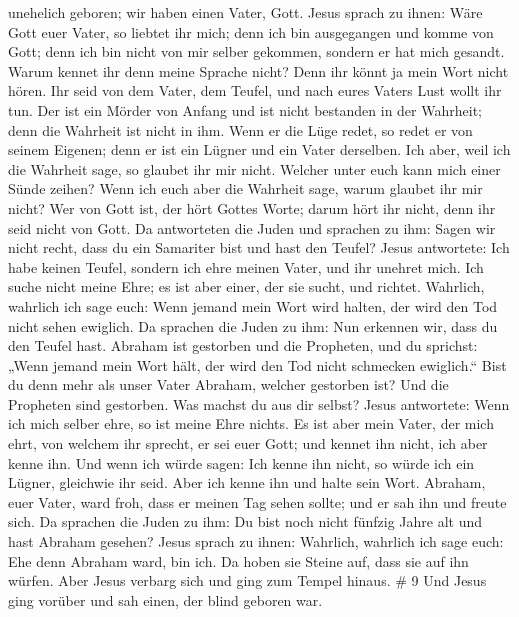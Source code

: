 unehelich geboren; wir haben einen Vater, Gott.  Jesus
sprach zu ihnen: Wäre Gott euer Vater, so liebtet ihr mich; denn ich bin
ausgegangen und komme von Gott; denn ich bin nicht von mir selber
gekommen, sondern er hat mich gesandt.  Warum kennet ihr
denn meine Sprache nicht? Denn ihr könnt ja mein Wort nicht hören.
 Ihr seid von dem Vater, dem Teufel, und nach eures Vaters
Lust wollt ihr tun. Der ist ein Mörder von Anfang und ist nicht
bestanden in der Wahrheit; denn die Wahrheit ist nicht in ihm. Wenn er
die Lüge redet, so redet er von seinem Eigenen; denn er ist ein Lügner
und ein Vater derselben.  Ich aber, weil ich die Wahrheit
sage, so glaubet ihr mir nicht.  Welcher unter euch kann
mich einer Sünde zeihen? Wenn ich euch aber die Wahrheit sage, warum
glaubet ihr mir nicht?  Wer von Gott ist, der hört Gottes
Worte; darum hört ihr nicht, denn ihr seid nicht von Gott. 
Da antworteten die Juden und sprachen zu ihm: Sagen wir nicht recht,
dass du ein Samariter bist und hast den Teufel?  Jesus
antwortete: Ich habe keinen Teufel, sondern ich ehre meinen Vater, und
ihr unehret mich.  Ich suche nicht meine Ehre; es ist aber
einer, der sie sucht, und richtet.  Wahrlich, wahrlich ich
sage euch: Wenn jemand mein Wort wird halten, der wird den Tod nicht
sehen ewiglich.  Da sprachen die Juden zu ihm: Nun erkennen
wir, dass du den Teufel hast. Abraham ist gestorben und die Propheten,
und du sprichst: „Wenn jemand mein Wort hält, der wird den Tod nicht
schmecken ewiglich.``  Bist du denn mehr als unser Vater
Abraham, welcher gestorben ist? Und die Propheten sind gestorben. Was
machst du aus dir selbst?  Jesus antwortete: Wenn ich mich
selber ehre, so ist meine Ehre nichts. Es ist aber mein Vater, der mich
ehrt, von welchem ihr sprecht, er sei euer Gott;  und
kennet ihn nicht, ich aber kenne ihn. Und wenn ich würde sagen: Ich
kenne ihn nicht, so würde ich ein Lügner, gleichwie ihr seid. Aber ich
kenne ihn und halte sein Wort.  Abraham, euer Vater, ward
froh, dass er meinen Tag sehen sollte; und er sah ihn und freute sich.
 Da sprachen die Juden zu ihm: Du bist noch nicht fünfzig
Jahre alt und hast Abraham gesehen?  Jesus sprach zu ihnen:
Wahrlich, wahrlich ich sage euch: Ehe denn Abraham ward, bin ich.
 Da hoben sie Steine auf, dass sie auf ihn würfen. Aber
Jesus verbarg sich und ging zum Tempel hinaus. \# 9  Und
Jesus ging vorüber und sah einen, der blind geboren war. 
